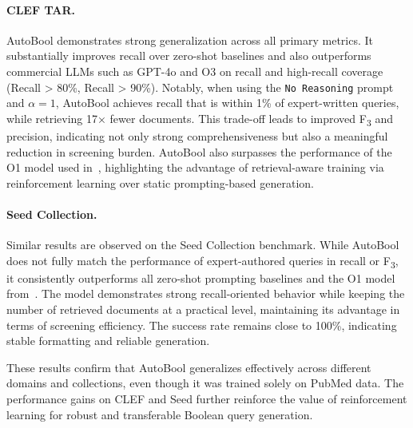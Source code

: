 \paragraph{CLEF TAR.} AutoBool demonstrates strong generalization across all primary metrics. It substantially improves recall over zero-shot baselines and also outperforms commercial LLMs such as GPT-4o and O3 on recall and high-recall coverage (Recall > 80\%, Recall > 90\%). Notably, when using the \texttt{No Reasoning} prompt and \(\alpha = 1\), AutoBool achieves recall that is within 1\% of expert-written queries, while retrieving 17× fewer documents. This trade-off leads to improved F\textsubscript{3} and precision, indicating not only strong comprehensiveness but also a meaningful reduction in screening burden. AutoBool also surpasses the performance of the O1 model used in~\citet{wang2025reassessing}, highlighting the advantage of retrieval-aware training via reinforcement learning over static prompting-based generation.

\paragraph{Seed Collection.} Similar results are observed on the Seed Collection benchmark. While AutoBool does not fully match the performance of expert-authored queries in recall or F\textsubscript{3}, it consistently outperforms all zero-shot prompting baselines and the O1 model from~\citet{wang2025reassessing}. The model demonstrates strong recall-oriented behavior while keeping the number of retrieved documents at a practical level, maintaining its advantage in terms of screening efficiency. The success rate remains close to 100\%, indicating stable formatting and reliable generation.

These results confirm that AutoBool generalizes effectively across different domains and collections, even though it was trained solely on PubMed data. The performance gains on CLEF and Seed further reinforce the value of reinforcement learning for robust and transferable Boolean query generation.



